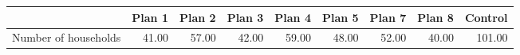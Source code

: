 \begin{table}[ht]
\centering
\begin{tabular}{rrrrrrrrr}
  \hline
 & Plan 1 & Plan 2 & Plan 3 & Plan 4 & Plan 5 & Plan 7 & Plan 8 & Control \\ 
  \hline
Number of households & 41.00 & 57.00 & 42.00 & 59.00 & 48.00 & 52.00 & 40.00 & 101.00 \\ 
   \hline
\end{tabular}
\end{table}
